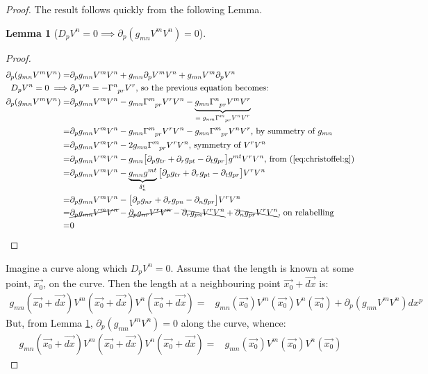 \documentclass[]{article}
\newtheorem{lemma}[thm]{Lemma}
\begin{document}
{\begin{proof}
	The result follows quickly from the following Lemma.
	\begin{lemma}[$D_pV^n=0 \implies \partial_p (g_{mn}V^mV^n)=0$]\label{lemma:d:length}
	\end{lemma}
	\begin{proof}
		\begin{align*}
			\partial_p (g_{mn}V^mV^n)=&\partial_p g_{mn} V^m V^n + g_{mn} \partial_p V^m V^n + g_{mn}V^m  \partial_p V^n\\
			D_pV^n=0 \implies&\partial_p V^n = -\Gamma\indices{^n_{pr}}V^r \text{, so the previous equation becomes:}\\
			\partial_p (g_{mn}V^mV^n)=&\partial_p g_{mn} V^m V^n -g_{mn}\Gamma\indices{^m_{pr}}V^rV^n-\underbrace{g_{mn}\Gamma\indices{^n_{pr}}V^mV^r}_\text{$=g_{nm}\Gamma\indices{^m_{pr}}V^nV^r$}\\
			=&\partial_p g_{mn} V^m V^n -g_{mn}\Gamma\indices{^m_{pr}}V^rV^n-g_{mn}\Gamma\indices{^m_{pr}}V^nV^r \text{, by summetry of $g_{mn}$}\\
			=&\partial_p g_{mn} V^m V^n -2g_{mn}\Gamma\indices{^m_{pr}}V^rV^n \text{, symmetry of $V^rV^n$}\\
			=&\partial_p g_{mn} V^m V^n - g_{mn}\big[\partial_p g_{tr} +\partial_r g_{pt} -\partial_t g_{pr} \big]g^{mt}V^rV^n \text{, from (\ref{eq:christoffel:g})}\\
			=&\partial_p g_{mn} V^m V^n - \underbrace{g_{mn}g^{mt}}_{\delta_n^t}\big[\partial_p g_{tr} +\partial_r g_{pt} -\partial_t g_{pr} \big]V^rV^n
			\\
			=&\partial_p g_{mn} V^m V^n - \big[\partial_p g_{nr} +\partial_r g_{pn} -\partial_n g_{pr} \big]V^rV^n\\
			=&\cancel{\partial_p g_{mn} V^m V^n} - \cancel{\partial_p g_{nr}V^rV^n} -\bcancel{\partial_r g_{pn}V^rV^n} +\bcancel{\partial_n g_{pr} V^rV^n} \text{, on relabelling }\\
			=&0
		\end{align*}
	\end{proof}
	Imagine a curve along which $D_pV^n=0$.  Assume that the length is known at some point, $\vec{x_0}$, on the curve. Then the length at a neighbouring point $\vec{x_0}+\vec{dx}$ is:
	\begin{align*}
		g_{mn}(\vec{x_0}+\vec{dx})V^m(\vec{x_0}+\vec{dx})V^n(\vec{x_0}+\vec{dx})=&	g_{mn}(\vec{x_0})V^m(\vec{x_0})V^n(\vec{x_0})+ \partial_p (g_{mn}V^mV^n) dx^p
	\end{align*}
	But, from Lemma \ref{lemma:d:length}, $\partial_p (g_{mn}V^mV^n)=0$ along the curve, whence:
	\begin{align*}
		g_{mn}(\vec{x_0}+\vec{dx})V^m(\vec{x_0}+\vec{dx})V^n(\vec{x_0}+\vec{dx})=&	g_{mn}(\vec{x_0})V^m(\vec{x_0})V^n(\vec{x_0})
	\end{align*}
\end{proof}

}
\end{document}

